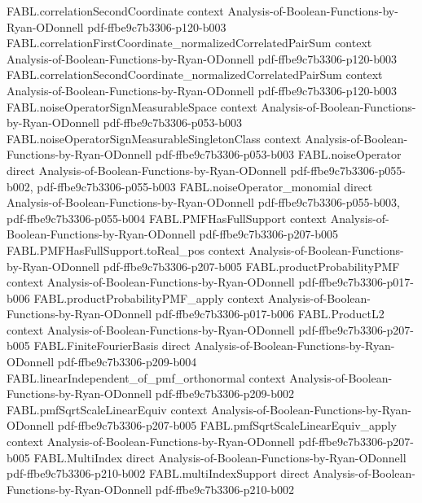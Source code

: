 \begin{theorem}
\proofstep
  {FABL.correlationSecondCoordinate}
  {context}
  {Analysis-of-Boolean-Functions-by-Ryan-ODonnell}
  {pdf-ffbe9c7b3306-p120-b003}
\proofstep
  {FABL.correlationFirstCoordinate_normalizedCorrelatedPairSum}
  {context}
  {Analysis-of-Boolean-Functions-by-Ryan-ODonnell}
  {pdf-ffbe9c7b3306-p120-b003}
\proofstep
  {FABL.correlationSecondCoordinate_normalizedCorrelatedPairSum}
  {context}
  {Analysis-of-Boolean-Functions-by-Ryan-ODonnell}
  {pdf-ffbe9c7b3306-p120-b003}
\proofstep
  {FABL.noiseOperatorSignMeasurableSpace}
  {context}
  {Analysis-of-Boolean-Functions-by-Ryan-ODonnell}
  {pdf-ffbe9c7b3306-p053-b003}
\proofstep
  {FABL.noiseOperatorSignMeasurableSingletonClass}
  {context}
  {Analysis-of-Boolean-Functions-by-Ryan-ODonnell}
  {pdf-ffbe9c7b3306-p053-b003}
\proofstep
  {FABL.noiseOperator}
  {direct}
  {Analysis-of-Boolean-Functions-by-Ryan-ODonnell}
  {pdf-ffbe9c7b3306-p055-b002,
    pdf-ffbe9c7b3306-p055-b003}
\proofstep
  {FABL.noiseOperator_monomial}
  {direct}
  {Analysis-of-Boolean-Functions-by-Ryan-ODonnell}
  {pdf-ffbe9c7b3306-p055-b003,
    pdf-ffbe9c7b3306-p055-b004}
\proofstep
  {FABL.PMFHasFullSupport}
  {context}
  {Analysis-of-Boolean-Functions-by-Ryan-ODonnell}
  {pdf-ffbe9c7b3306-p207-b005}
\proofstep
  {FABL.PMFHasFullSupport.toReal_pos}
  {context}
  {Analysis-of-Boolean-Functions-by-Ryan-ODonnell}
  {pdf-ffbe9c7b3306-p207-b005}
\proofstep
  {FABL.productProbabilityPMF}
  {context}
  {Analysis-of-Boolean-Functions-by-Ryan-ODonnell}
  {pdf-ffbe9c7b3306-p017-b006}
\proofstep
  {FABL.productProbabilityPMF_apply}
  {context}
  {Analysis-of-Boolean-Functions-by-Ryan-ODonnell}
  {pdf-ffbe9c7b3306-p017-b006}
\proofstep
  {FABL.ProductL2}
  {context}
  {Analysis-of-Boolean-Functions-by-Ryan-ODonnell}
  {pdf-ffbe9c7b3306-p207-b005}
\proofstep
  {FABL.FiniteFourierBasis}
  {direct}
  {Analysis-of-Boolean-Functions-by-Ryan-ODonnell}
  {pdf-ffbe9c7b3306-p209-b004}
\proofstep
  {FABL.linearIndependent_of_pmf_orthonormal}
  {context}
  {Analysis-of-Boolean-Functions-by-Ryan-ODonnell}
  {pdf-ffbe9c7b3306-p209-b002}
\proofstep
  {FABL.pmfSqrtScaleLinearEquiv}
  {context}
  {Analysis-of-Boolean-Functions-by-Ryan-ODonnell}
  {pdf-ffbe9c7b3306-p207-b005}
\proofstep
  {FABL.pmfSqrtScaleLinearEquiv_apply}
  {context}
  {Analysis-of-Boolean-Functions-by-Ryan-ODonnell}
  {pdf-ffbe9c7b3306-p207-b005}
\proofstep
  {FABL.MultiIndex}
  {direct}
  {Analysis-of-Boolean-Functions-by-Ryan-ODonnell}
  {pdf-ffbe9c7b3306-p210-b002}
\proofstep
  {FABL.multiIndexSupport}
  {direct}
  {Analysis-of-Boolean-Functions-by-Ryan-ODonnell}
  {pdf-ffbe9c7b3306-p210-b002}

\end{theorem}
